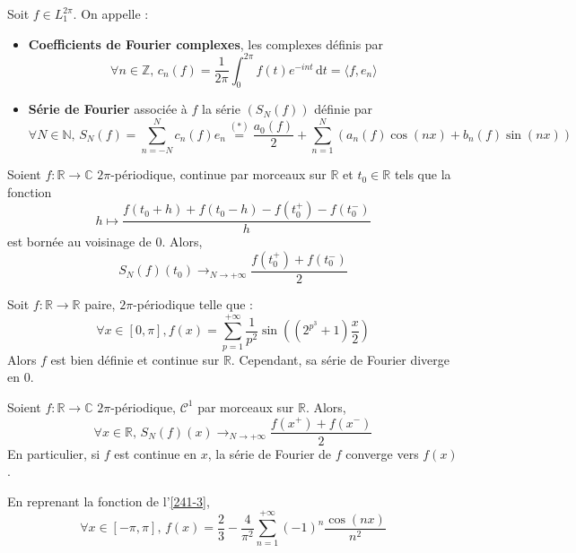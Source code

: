 	
	\begin{definition}
		Soit $f \in L_1^{2\pi}$. On appelle :
		\begin{itemize}
			\item \textbf{Coefficients de Fourier complexes}, les complexes définis par
			\[ \forall n \in \mathbb{Z}, \, c_n(f) = \frac{1}{2 \pi} \int_0^{2\pi} f(t) e^{-int} \, \mathrm{d}t = \langle f, e_n \rangle \]
			\item \textbf{Série de Fourier} associée à $f$ la série $(S_N(f))$ définie par
			\[ \forall N \in \mathbb{N}, \, S_N(f) = \sum_{n=-N}^{N} c_n(f) e_n \overset{(*)}{=} \frac{a_0(f)}{2} + \sum_{n = 1}^N (a_n(f) \cos(nx) + b_n(f) \sin(nx)) \]
		\end{itemize}
	\end{definition}
	
	
	\begin{theorem}[Dirichlet]
		Soient $f : \mathbb{R} \rightarrow \mathbb{C}$ $2\pi$-périodique, continue par morceaux sur $\mathbb{R}$ et $t_0 \in \mathbb{R}$ tels que la fonction
		\[ h \mapsto \frac{f(t_0 + h) + f(t_0 - h) - f(t_0^+) - f(t_0^-)}{h} \]
		est bornée au voisinage de $0$. Alors,
		\[ S_N(f)(t_0) \longrightarrow_{N \rightarrow +\infty} \frac{f(t_0^+) + f(t_0^-)}{2} \]
	\end{theorem}
	
	\begin{cexample}
		Soit $f : \mathbb{R} \rightarrow \mathbb{R}$ paire, $2\pi$-périodique telle que :
		\[ \forall x \in [0, \pi], f(x) = \sum_{p=1}^{+\infty} \frac{1}{p^2} \sin \left( (2^{p^3} + 1) \frac{x}{2} \right)
		\]
		Alors $f$ est bien définie et continue sur $\mathbb{R}$. Cependant, sa série de Fourier diverge en $0$.
	\end{cexample}
	
	\begin{corollary}
		Soient $f : \mathbb{R} \rightarrow \mathbb{C}$ $2\pi$-périodique, $\mathcal{C}^1$ par morceaux sur $\mathbb{R}$. Alors,
		\[ \forall x \in \mathbb{R}, \, S_N(f)(x) \longrightarrow_{N \rightarrow +\infty} \frac{f(x^+) + f(x^-)}{2} \]
		En particulier, si $f$ est continue en $x$, la série de Fourier de $f$ converge vers $f(x)$.
	\end{corollary}
	
	\begin{example}
		\label{241-3}
		En reprenant la fonction de l'\cref{241-3},
		\[ \forall x \in [-\pi, \pi], \, f(x) = \frac{2}{3} - \frac{4}{\pi^2} \sum_{n=1}^{+\infty} (-1)^n \frac{\cos(nx)}{n^2} \]
	\end{example}
	
